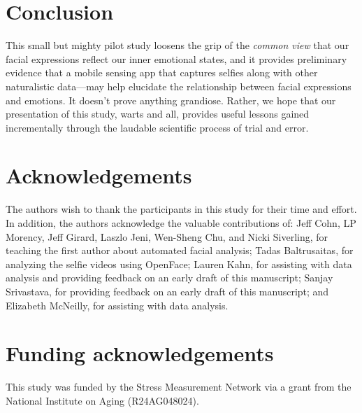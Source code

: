 \documentclass[authordate, empirical,issue]{jote-new-article}
\begin{document}
\section{Conclusion}







This small but mighty pilot study loosens the grip of the \emph{common view} that our facial expressions reflect our inner emotional states, and it provides preliminary evidence that a mobile sensing app that captures selfies along with other naturalistic data—may help elucidate the relationship between facial expressions and emotions. It doesn't prove anything grandiose. Rather, we hope that our presentation of this study, warts and all, provides useful lessons gained incrementally through the laudable scientific process of trial and error.






\section{Acknowledgements}







The authors wish to thank the participants in this study for their time and effort. In addition, the authors acknowledge the valuable contributions of: Jeff Cohn, LP Morency, Jeff Girard, Laszlo Jeni, Wen-Sheng Chu, and Nicki Siverling, for teaching the first author about automated facial analysis; Tadas Baltrusaitas, for analyzing the selfie videos using OpenFace; Lauren Kahn, for assisting with data analysis and providing feedback on an early draft of this manuscript; Sanjay Srivastava, for providing feedback on an early draft of this manuscript; and Elizabeth McNeilly, for assisting with data analysis.










\section{Funding acknowledgements}

This study was funded by the Stress Measurement Network via a grant from the National Institute on Aging (R24AG048024).
\end{document}
